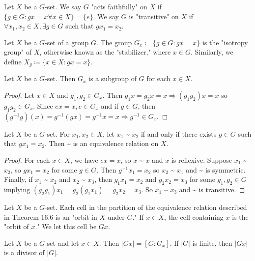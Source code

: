 \documentclass[a4paper,11pt]{article}
\begin{document}
\begin{outline}
    Let \(X\) be a \(G\)-set. We say \(G\) "acts faithfully" on \(X\) if \(\{g \in G : gx = x \forall x
    \in X\} = \{e\}\). We say \(G\) is "transitive" on \(X\) if \(\forall x_1, x_2 \in X, \exists g \in G\) 
    such that \(gx_1 = x_2\).
    
    Let \(X\) be a \(G\)-set of a group \(G\). The group \(G_x \coloneqq \{g \in G : gx = x\}\) is
    the "isotropy group" of \(X\), otherwise known as the "stabilizer," where \(x \in G\). Similarly, 
    we define \(X_g \coloneqq \{x \in X : gx = x\}\).
      
    Let \(X\) be a \(G\)-set. Then \(G_x\) is a subgroup of \(G\) for each \(x \in X\).
    
    \begin{proof}
      Let \(x \in X\) and \(g_1, g_2 \in G_x\). Then \(g_1x = g_2x = x \Rightarrow (g_1g_2)x = x\) so \(g_1g_2 \in G_x\).
      Since \(ex = x, e \in G_x\) and if \(g \in G\), then \((g^{-1}g)(x) = g^{-1}(gx) = g^{-1}x = x \Rightarrow g^{-1}
      \in G_x\).
    \end{proof}
  
    Let \(X\) be a \(G\)-set. For \(x_1, x_2 \in X\), let \(x_1\) \textasciitilde{} \(x_2\) if and
    only if there exists \(g \in G\) such that \(gx_1 = x_2\). Then \textasciitilde{} is an equivalence 
    relation on \(X\).
    
    \begin{proof}
      For each \(x \in X\), we have \(ex = x\), so \(x\) \textasciitilde{} \(x\) and \(x\) is reflexive. Suppose
      \(x_1\) \textasciitilde{} \(x_2\), so \(gx_1 = x_2\) for some \(g \in G\). Then \(g^{-1}x_1 = x_2\) so \(x_2\)
      \textasciitilde{} \(x_1\) and \textasciitilde{} is symmetric. Finally, if \(x_1\) \textasciitilde{} \(x_2\) and
      \(x_2\) \textasciitilde{} \(x_3\), then \(g_1x_1 = x_2\) and \(g_2x_2 = x_3\) for some \(g_1, g_2 \in G\)
      implying \((g_2g_1)x_1 = g_2(g_1x_1) = g_2x_2 = x_3\). So \(x_1\) \textasciitilde{} \(x_3\) and \textasciitilde{}
      is transitive.
    \end{proof}
      
    Let \(X\) be a \(G\)-set. Each cell in the partition of the equivalence relation described in Theorem 16.6 
    is an "orbit in \(X\) under \(G\)." If \(x \in X\), the cell containing \(x\) is the "orbit of \(x\)." We let 
    this cell be \(Gx\).
      
    Let \(X\) be a \(G\)-set and let \(x \in X\). Then \(|Gx| = [G:G_x]\). If \(|G|\) is finite, then \(|Gx|\) 
    is a divisor of \(|G|\).
    

\end{outline}
\end{document}
